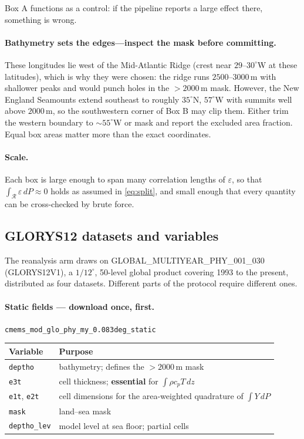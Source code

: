 \documentclass[11pt]{article}
\begin{document}
Box A functions as a control: if the pipeline reports a large effect there, something is wrong.

\paragraph{Bathymetry sets the edges---inspect the mask before committing.} These longitudes
lie west of the Mid-Atlantic Ridge (crest near $29$--$30^\circ$W at these latitudes), which is
why they were chosen: the ridge runs $2500$--$3000$\,m with shallower peaks and would punch
holes in the $>2000$\,m mask. However, the New England Seamounts extend southeast to roughly
$35^\circ$N, $57^\circ$W with summits well above $2000$\,m, so the southwestern corner of Box B
may clip them. Either trim the western boundary to $\sim55^\circ$W or mask and report the
excluded area fraction. Equal box areas matter more than the exact coordinates.

\paragraph{Scale.} Each box is large enough to span many correlation lengths of $\varepsilon$,
so that $\int_{\mathcal{R}} \varepsilon \, dP \approx 0$ holds as assumed in
\eqref{eq:split}, and small enough that every quantity can be cross-checked by brute force.

\subsection{GLORYS12 datasets and variables}
\label{sec:glorys}

The reanalysis arm draws on GLOBAL\_MULTIYEAR\_PHY\_001\_030 (GLORYS12V1), a $1/12^\circ$,
50-level global product covering 1993 to the present, distributed as four datasets. Different
parts of the protocol require different ones.

\paragraph{Static fields --- download once, first.}
\texttt{cmems\_mod\_glo\_phy\_my\_0.083deg\_static}

\begin{table}[h]
\centering
\begin{tabular}{ll}
\toprule
Variable & Purpose \\
\midrule
\texttt{deptho} & bathymetry; defines the $>2000$\,m mask \\
\texttt{e3t} & cell thickness; \textbf{essential} for $\int \rho c_p T\,dz$ \\
\texttt{e1t}, \texttt{e2t} & cell dimensions for the area-weighted quadrature of $\int Y\,dP$ \\
\texttt{mask} & land--sea mask \\
\texttt{deptho\_lev} & model level at sea floor; partial cells \\
\bottomrule
\end{tabular}
\end{table}
\end{document}
